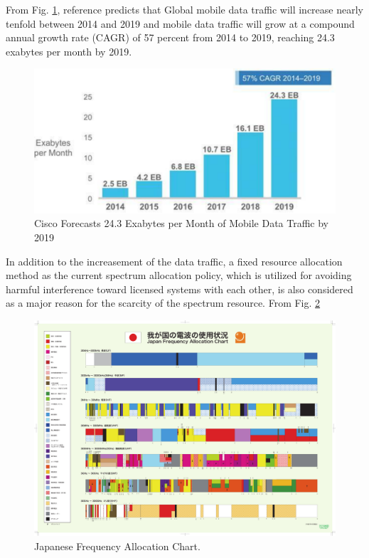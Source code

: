  From Fig. \ref{fig:Cisco}, reference \cite{ref:Cisco} predicts that Global mobile data traffic will increase nearly tenfold between 2014 and 2019 and mobile data traffic will grow at a compound annual growth rate (CAGR) of 57 percent from 2014 to 2019, reaching 24.3 exabytes per month by 2019. 
\begin{figure}[!htp]
\includegraphics[width=150mm,clip]{traffic_trend.pdf}
\caption{Cisco Forecasts 24.3 Exabytes per Month of Mobile Data Traffic by 2019}
\label{fig:Cisco}
\end{figure}
In addition to the increasement of the data traffic, a fixed resource allocation method as the current spectrum allocation policy, which is utilized for avoiding harmful interference toward licensed systems with each other, is also considered as a major reason for the scarcity of the spectrum resource. From Fig. \ref{fig:MIC}
\begin{figure}[!htp]
\includegraphics[width=150mm,clip]{frequency_alloc.pdf}
\caption{Japanese Frequency Allocation Chart.}
\label{fig:MIC}
\end{figure}

